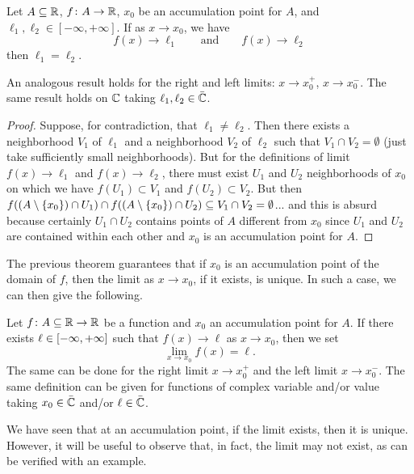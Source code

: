\begin{theorem}
\mymark{*}
Let $A\subseteq {\mathbb R}$, $f\colon A \to {\mathbb R}$, $x_0$
be an accumulation point for $A$, and $\ell_1, \ell_2\in [-\infty,+\infty]$.
If as $x\to x_0$, we have
\[
  f(x) \to \ell_1 \qquad\text{and}\qquad f(x) \to \ell_2
\]
then $\ell_1=\ell_2$.

An analogous result holds for the right and left limits: $x\to x_0^+$, 
$x\to x_0^-$.
The same result holds on ${\mathbb C}$
taking $\ell_1,\ell_2\in \bar {{\mathbb C}}$.
\end{theorem}
%
\begin{proof}
\mymark{*}
Suppose, for contradiction, that $\ell_1\neq \ell_2$.
Then there exists a neighborhood $V_1$ of $\ell_1$ and a neighborhood $V_2$ of
$\ell_2$
such that $V_1\cap V_2 = \emptyset$ (just take sufficiently small
neighborhoods).
But for the definitions of limit $f(x)\to \ell_1$ and $f(x)\to \ell_2$, 
there must exist $U_1$ and $U_2$ neighborhoods of $x_0$ on which we have 
$f(U_1)\subset V_1$ and $f(U_2)\subset V_2$. 
But then $f((A\setminus{\left\{ x_0 \right\}})\cap U_1)\cap
f((A\setminus{\left\{ x_0 \right\}})\cap U_2)\subseteq V_1\cap V_2 = \emptyset$...
and this is absurd because certainly $U_1\cap U_2$ 
contains points of $A$ different from $x_0$ since 
$U_1$ and $U_2$ are contained within each other and $x_0$ 
is an accumulation point for $A$.
\end{proof}

The previous theorem guarantees that if $x_0$ is an accumulation point 
of the domain of $f$, then the limit as $x\to x_0$, if it exists, is unique. 
In such a case, we can then give the following.
%
\begin{definition}
Let $f\colon A\subseteq {\mathbb R} \to {\mathbb R}$ be a function and $x_0$ 
an accumulation point for $A$. 
If there exists $\ell\in\left[-\infty,+\infty\right]$ such that
$f(x)\to \ell$ as $x\to x_0$, then we set
\[
  \lim_{x\to x_0} f(x) = \ell.
\]
The same can be done for the right limit $x\to x_0^+$ 
and the left limit $x\to x_0^-$.
The same definition can be given for functions of complex variable and/or value 
taking $x_0\in \bar {{\mathbb C}}$ 
and/or $\ell\in \bar {{\mathbb C}}$.
\end{definition}

We have seen that at an accumulation point, if the limit 
exists, then it is unique.
However, it will be useful to observe that, in fact, the limit may not 
exist, as can be verified with an example.

